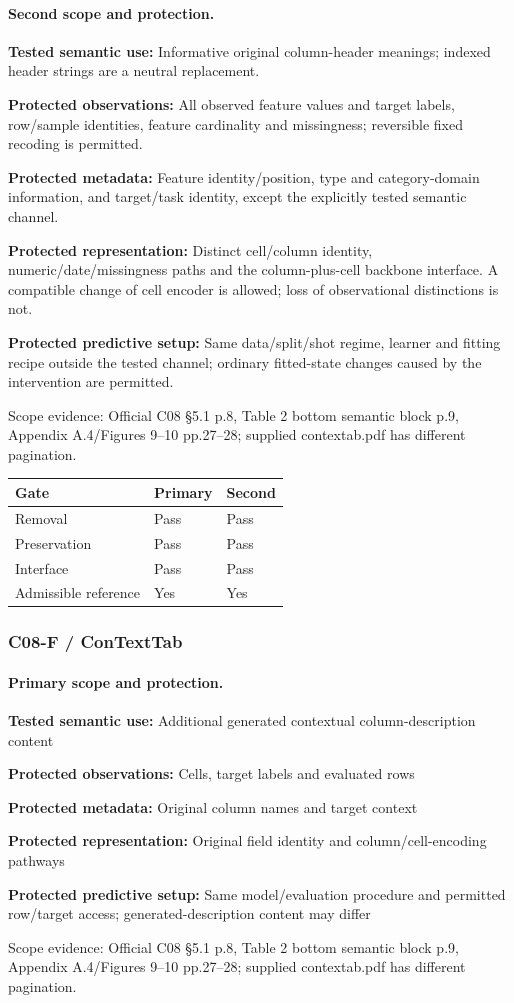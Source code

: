 \documentclass[10pt]{article}
\begin{document}
\paragraph{Second scope and protection.}
\textbf{Tested semantic use:} Informative original column-header meanings; indexed header strings are a neutral replacement.\par
\textbf{Protected observations:} All observed feature values and target labels, row/sample identities, feature cardinality and missingness; reversible fixed recoding is permitted.\par
\textbf{Protected metadata:} Feature identity/position, type and category-domain information, and target/task identity, except the explicitly tested semantic channel.\par
\textbf{Protected representation:} Distinct cell/column identity, numeric/date/missingness paths and the column-plus-cell backbone interface. A compatible change of cell encoder is allowed; loss of observational distinctions is not.\par
\textbf{Protected predictive setup:} Same data/split/shot regime, learner and fitting recipe outside the tested channel; ordinary fitted-state changes caused by the intervention are permitted.\par
Scope evidence: Official C08 §5.1 p.8, Table 2 bottom semantic block p.9, Appendix A.4/Figures 9--10 pp.27--28; supplied contextab.pdf has different pagination.\par
\begin{tabular}{lll}\toprule Gate & Primary & Second \\ \midrule
Removal & Pass & Pass \\
Preservation & Pass & Pass \\
Interface & Pass & Pass \\
Admissible reference & Yes & Yes \\
\bottomrule\end{tabular}
\subsubsection*{C08-F / ConTextTab}
\paragraph{Primary scope and protection.}
\textbf{Tested semantic use:} Additional generated contextual column-description content\par
\textbf{Protected observations:} Cells, target labels and evaluated rows\par
\textbf{Protected metadata:} Original column names and target context\par
\textbf{Protected representation:} Original field identity and column/cell-encoding pathways\par
\textbf{Protected predictive setup:} Same model/evaluation procedure and permitted row/target access; generated-description content may differ\par
Scope evidence: Official C08 §5.1 p.8, Table 2 bottom semantic block p.9, Appendix A.4/Figures 9--10 pp.27--28; supplied contextab.pdf has different pagination.\par
\end{document}

